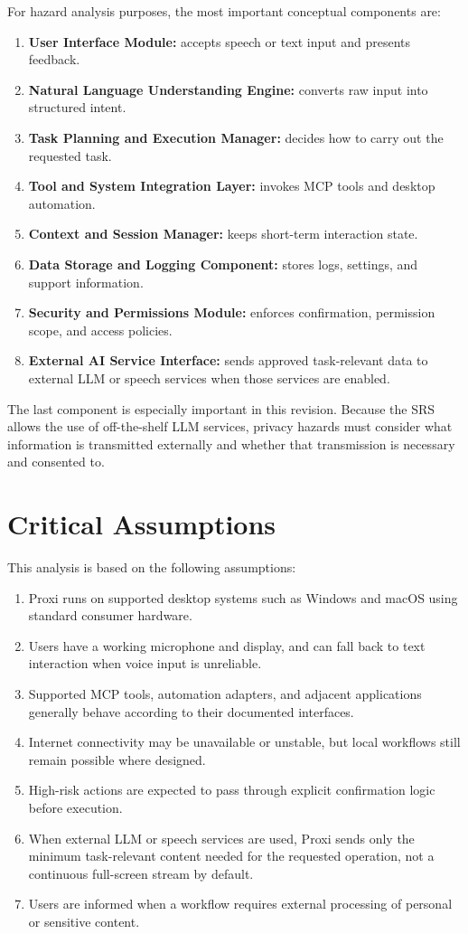 \documentclass[12pt]{article}
\begin{document}
For hazard analysis purposes, the most important conceptual components are:
\begin{enumerate}[label=\arabic*., noitemsep]
  \item \textbf{User Interface Module:} accepts speech or text input and
  presents feedback.
  \item \textbf{Natural Language Understanding Engine:} converts raw input
  into structured intent.
  \item \textbf{Task Planning and Execution Manager:} decides how to carry
  out the requested task.
  \item \textbf{Tool and System Integration Layer:} invokes MCP tools and
  desktop automation.
  \item \textbf{Context and Session Manager:} keeps short-term interaction
  state.
  \item \textbf{Data Storage and Logging Component:} stores logs, settings,
  and support information.
  \item \textbf{Security and Permissions Module:} enforces confirmation,
  permission scope, and access policies.
  \item \textbf{External AI Service Interface:} sends approved task-relevant
  data to external LLM or speech services when those services are enabled.
\end{enumerate}

The last component is especially important in this revision. Because the SRS
allows the use of off-the-shelf LLM services, privacy hazards must consider
what information is transmitted externally and whether that transmission is
necessary and consented to.

\section{Critical Assumptions}

This analysis is based on the following assumptions:
\begin{enumerate}[label=A\arabic*., noitemsep]
  \item Proxi runs on supported desktop systems such as Windows and macOS
  using standard consumer hardware.
  \item Users have a working microphone and display, and can fall back to
  text interaction when voice input is unreliable.
  \item Supported MCP tools, automation adapters, and adjacent applications
  generally behave according to their documented interfaces.
  \item Internet connectivity may be unavailable or unstable, but local
  workflows still remain possible where designed.
  \item High-risk actions are expected to pass through explicit confirmation
  logic before execution.
  \item When external LLM or speech services are used, Proxi sends only the
  minimum task-relevant content needed for the requested operation, not a
  continuous full-screen stream by default.
  \item Users are informed when a workflow requires external processing of
  personal or sensitive content.
\end{enumerate}
\end{document}

